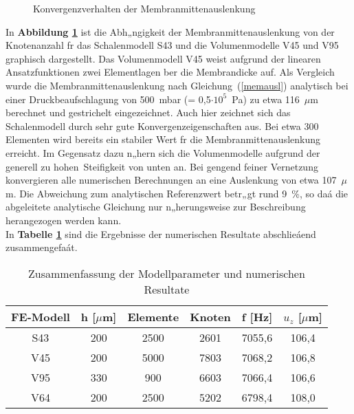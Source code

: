 \begin{figure}[htb]
\begin{center}

\setabbvze
\end{center}
\caption{\label{abbkonvausl}
 Konvergenzverhalten der Membranmittenauslenkung}
\end{figure}
In {\bf Abbildung \ref{abbkonvausl}} ist die Abh„ngigkeit der
Membranmittenauslenkung von der
Knotenanzahl fr das Schalenmodell S43 und die Volumenmodelle
V45 und V95 graphisch dargestellt. Das Volumenmodell V45 weist
aufgrund der linearen Ansatzfunktionen zwei Elementlagen ber
die Membrandicke auf. Als Vergleich wurde die Membranmittenauslenkung
nach Gleichung~(\ref{memausl}) analytisch bei einer Druckbeaufschlagung
von 500~mbar (= 0,5$\cdot 10^{5}$~Pa) zu etwa 116~$\mu$m berechnet und
gestrichelt eingezeichnet. Auch hier zeichnet sich das Schalenmodell
durch sehr gute Konvergenzeigenschaften aus. Bei etwa 300 Elementen wird
bereits ein stabiler Wert fr die Membranmittenauslenkung
erreicht. Im Gegensatz dazu n„hern sich die Volumenmodelle
aufgrund der generell zu \glqq hohen\grqq \, Steifigkeit von
unten an. Bei gengend feiner Vernetzung konvergieren alle numerischen
Berechnungen an eine Auslenkung von etwa 107~$\mu$m. Die Abweichung
zum analytischen Referenzwert betr„gt rund 9~\%, so daá die abgeleitete
analytische Gleichung nur n„herungsweise zur Beschreibung herangezogen
werden kann.\\
%
In {\bf Tabelle \ref{tabfreqzus}} sind die Ergebnisse der numerischen
Resultate abschlieáend zusammengefaát.
\begin{table}[htb]
\caption{\label{tabfreqzus}
 Zusammenfassung der Modellparameter und numerischen Resultate}
\begin{center}
\begin{tabular} {|c||c|c|c||c|c|}
\hline
FE-Modell & h [$\mu$m] & Elemente & Knoten & f [Hz] & $u_{z}$ [$\mu$m] \\
\hline \hline
S43  & 200 &  2500  & 2601  & 7055,6  & 106,4 \\
V45  & 200 &  5000  & 7803  & 7068,2  & 106,8 \\
V95  & 330 &  900   & 6603  & 7066,4  & 106,6 \\
\hline
V64  & 200 &  2500  & 5202  & 6798,4  & 108,0 \\
\hline
\end{tabular}\\
\end{center}
\end{table}
